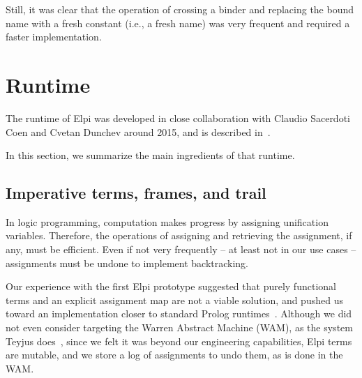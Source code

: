 \documentclass[a4paper, 11pt]{book}
\begin{document}
Still, it was clear that the operation of crossing a binder and replacing the
bound name with a fresh constant (i.e., a fresh name) was very frequent and
required a faster implementation.

\newcommand{\theotherfragment}{\ensuremath{L_{\lambda}}\xspace}
\newcommand{\thefragment}{\ensuremath{L_{\lambda}^{\beta}}\xspace}
\newtheorem{definition}{Definition}

\section{Runtime}

The runtime of Elpi was developed in close collaboration with Claudio
Sacerdoti Coen and Cvetan Dunchev around 2015, and is described
in~\cite{dunchev15lpar}.

In this section, we summarize the main ingredients of that runtime.

\subsection{Imperative terms, frames, and trail}\label{sec:terms}

In logic programming, computation makes progress by assigning unification
variables. Therefore, the operations of assigning and retrieving the assignment,
if any, must be efficient. Even if not very frequently -- at least not in our use
cases -- assignments must be undone to implement backtracking.

Our experience with the first Elpi prototype suggested that purely functional
terms and an explicit assignment map are not a viable solution, and pushed us
toward an implementation closer to standard Prolog runtimes~\cite{wam}.
Although we did not even consider targeting the Warren Abstract Machine (WAM),
as the system Teyjus does~\cite{teyjus}, since we felt it was beyond our
engineering capabilities, Elpi terms are mutable, and we store a log of
assignments to undo them, as is done in the WAM.
\end{document}
